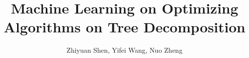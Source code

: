 \documentclass[10pt,journal,compsoc]{IEEEtran} %
\begin{document}
\title{Machine Learning on Optimizing Algorithms on Tree Decomposition}

\author{Zhiyuan Shen,
Yifei Wang,
Nuo Zheng
}


\IEEEtitleabstractindextext{%
\begin{abstract}

\end{abstract}

}

\maketitle









\end{document}
